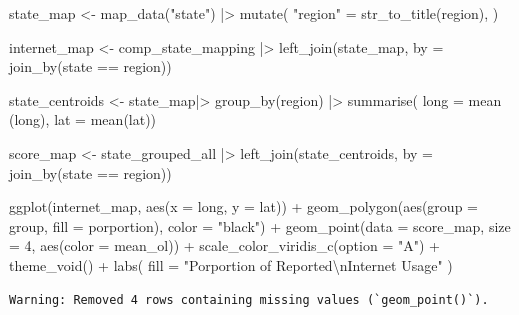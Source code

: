 \documentclass[
  letterpaper,
  DIV=11,
  numbers=noendperiod]{scrartcl}
\newenvironment{Shaded}{\begin{snugshade}}{\end{snugshade}}
\newcommand{\AttributeTok}[1]{\textcolor[rgb]{0.40,0.45,0.13}{#1}}
\newcommand{\DecValTok}[1]{\textcolor[rgb]{0.68,0.00,0.00}{#1}}
\newcommand{\FunctionTok}[1]{\textcolor[rgb]{0.28,0.35,0.67}{#1}}
\newcommand{\NormalTok}[1]{\textcolor[rgb]{0.00,0.23,0.31}{#1}}
\newcommand{\OtherTok}[1]{\textcolor[rgb]{0.00,0.23,0.31}{#1}}
\newcommand{\SpecialCharTok}[1]{\textcolor[rgb]{0.37,0.37,0.37}{#1}}
\newcommand{\StringTok}[1]{\textcolor[rgb]{0.13,0.47,0.30}{#1}}
\begin{document}
\begin{Shaded}
\begin{Highlighting}[]
\NormalTok{state\_map }\OtherTok{\textless{}{-}} \FunctionTok{map\_data}\NormalTok{(}\StringTok{"state"}\NormalTok{) }\SpecialCharTok{|\textgreater{}}
  \FunctionTok{mutate}\NormalTok{(}
  \StringTok{"region"} \OtherTok{=} \FunctionTok{str\_to\_title}\NormalTok{(region),}
\NormalTok{  ) }

\NormalTok{internet\_map }\OtherTok{\textless{}{-}}\NormalTok{ comp\_state\_mapping }\SpecialCharTok{|\textgreater{}}
  \FunctionTok{left\_join}\NormalTok{(state\_map, }\AttributeTok{by =} \FunctionTok{join\_by}\NormalTok{(state }\SpecialCharTok{==}\NormalTok{ region))}

\NormalTok{state\_centroids }\OtherTok{\textless{}{-}}\NormalTok{ state\_map}\SpecialCharTok{|\textgreater{}}
  \FunctionTok{group\_by}\NormalTok{(region) }\SpecialCharTok{|\textgreater{}}
  \FunctionTok{summarise}\NormalTok{( }\AttributeTok{long =} \FunctionTok{mean}\NormalTok{ (long), }\AttributeTok{lat =} \FunctionTok{mean}\NormalTok{(lat))}

\NormalTok{score\_map }\OtherTok{\textless{}{-}}\NormalTok{ state\_grouped\_all }\SpecialCharTok{|\textgreater{}}
  \FunctionTok{left\_join}\NormalTok{(state\_centroids, }\AttributeTok{by =} \FunctionTok{join\_by}\NormalTok{(state }\SpecialCharTok{==}\NormalTok{ region))}


\FunctionTok{ggplot}\NormalTok{(internet\_map, }\FunctionTok{aes}\NormalTok{(}\AttributeTok{x =}\NormalTok{ long, }\AttributeTok{y =}\NormalTok{ lat)) }\SpecialCharTok{+}
    \FunctionTok{geom\_polygon}\NormalTok{(}\FunctionTok{aes}\NormalTok{(}\AttributeTok{group =}\NormalTok{ group, }\AttributeTok{fill =}\NormalTok{ porportion), }\AttributeTok{color =} \StringTok{"black"}\NormalTok{) }\SpecialCharTok{+}
    \FunctionTok{geom\_point}\NormalTok{(}\AttributeTok{data =}\NormalTok{ score\_map, }\AttributeTok{size =} \DecValTok{4}\NormalTok{, }\FunctionTok{aes}\NormalTok{(}\AttributeTok{color =}\NormalTok{ mean\_ol)) }\SpecialCharTok{+}
    \FunctionTok{scale\_color\_viridis\_c}\NormalTok{(}\AttributeTok{option =} \StringTok{"A"}\NormalTok{) }\SpecialCharTok{+}
    \FunctionTok{theme\_void}\NormalTok{() }\SpecialCharTok{+}
    \FunctionTok{labs}\NormalTok{(}
      \AttributeTok{fill =} \StringTok{"Porportion of Reported}\SpecialCharTok{\textbackslash{}n}\StringTok{Internet Usage"}
\NormalTok{    )}
\end{Highlighting}
\end{Shaded}

\begin{verbatim}
Warning: Removed 4 rows containing missing values (`geom_point()`).
\end{verbatim}
\end{document}
